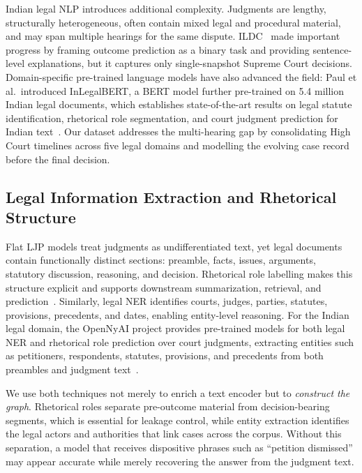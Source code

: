 \documentclass[runningheads]{llncs}
\begin{document}
Indian legal NLP introduces additional complexity. Judgments are lengthy, structurally heterogeneous, often contain mixed legal and procedural material, and may span multiple hearings for the same dispute. ILDC~\cite{malik2021ildc} made important progress by framing outcome prediction as a binary task and providing sentence-level explanations, but it captures only single-snapshot Supreme Court decisions. Domain-specific pre-trained language models have also advanced the field: Paul et al.\ introduced InLegalBERT, a BERT model further pre-trained on 5.4 million Indian legal documents, which establishes state-of-the-art results on legal statute identification, rhetorical role segmentation, and court judgment prediction for Indian text~\cite{paul2023inlegalbert}. Our dataset addresses the multi-hearing gap by consolidating High Court timelines across five legal domains and modelling the evolving case record before the final decision.

\subsection{Legal Information Extraction and Rhetorical Structure}
\label{subsec:legal-ie}

Flat LJP models treat judgments as undifferentiated text, yet legal documents contain functionally distinct sections: preamble, facts, issues, arguments, statutory discussion, reasoning, and decision. Rhetorical role labelling makes this structure explicit and supports downstream summarization, retrieval, and prediction~\cite{bhattacharya2019identification,shukla2022legal}. Similarly, legal NER identifies courts, judges, parties, statutes, provisions, precedents, and dates, enabling entity-level reasoning. For the Indian legal domain, the OpenNyAI project provides pre-trained models for both legal NER and rhetorical role prediction over court judgments, extracting entities such as petitioners, respondents, statutes, provisions, and precedents from both preambles and judgment text~\cite{kalamkar2022opennyai}.

We use both techniques not merely to enrich a text encoder but to \emph{construct the graph}. Rhetorical roles separate pre-outcome material from decision-bearing segments, which is essential for leakage control, while entity extraction identifies the legal actors and authorities that link cases across the corpus. Without this separation, a model that receives dispositive phrases such as ``petition dismissed'' may appear accurate while merely recovering the answer from the judgment text.
\end{document}
